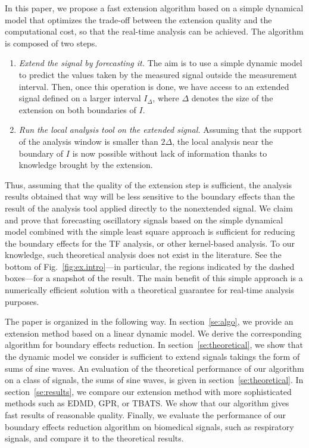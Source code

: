 \documentclass[journal]{IEEEtran}
\begin{document}
In this paper, we propose a fast extension algorithm based on a simple dynamical model that optimizes the trade-off between the extension quality and the computational cost, so that the real-time analysis can be achieved. The algorithm is composed of two steps.
\begin{enumerate}
\item \emph{Extend the signal by forecasting it.} The aim is to use a simple dynamic model to predict the values taken by the measured signal outside the measurement interval. Then, once this operation is done, we have access to an extended signal defined on a larger interval $I_\Delta$, where $\Delta$ denotes the size of the extension on both boundaries of $I$.
\item \emph{Run the local analysis tool on the extended signal.} Assuming that the support of the analysis window is smaller than $2\Delta$, the local analysis near the boundary of $I$ is now possible without lack of information thanks to knowledge brought by the extension. 
\end{enumerate}

Thus, assuming that the quality of the extension step is sufficient, the analysis results obtained that way will be less sensitive to the boundary effects than the result of the analysis tool applied directly to the nonextended signal. We claim and prove that forecasting oscillatory signals based on the simple dynamical model combined with the simple least square approach is sufficient for reducing the boundary effects for the TF analysis, or other kernel-based analysis. To our knowledge, such theoretical analysis does not exist in the literature. See the bottom of Fig.~\ref{fig:ex.intro}---in particular, the regions indicated by the dashed boxes---for a snapshot of the result. The main benefit of this simple approach is a numerically efficient solution with a theoretical guarantee for real-time analysis purposes. 

The paper is organized in the following way. In section~\ref{se:algo}, we provide an extension method based on a linear dynamic model. We derive the corresponding algorithm for boundary effects reduction. In section~\ref{se:theoretical}, we show that the dynamic model we consider is sufficient to extend signals takings the form of sums of sine waves. An evaluation of the theoretical performance of our algorithm on a class of signals, the sums of sine waves, is given in section~\ref{se:theoretical}. In section~\ref{se:results}, we compare our extension method with more sophisticated methods such as EDMD, GPR, or TBATS. We show that our algorithm gives fast results of reasonable quality. Finally, we evaluate the performance of our boundary effects reduction algorithm on biomedical signals, such as respiratory signals, and compare it to the theoretical results. 
\end{document}
